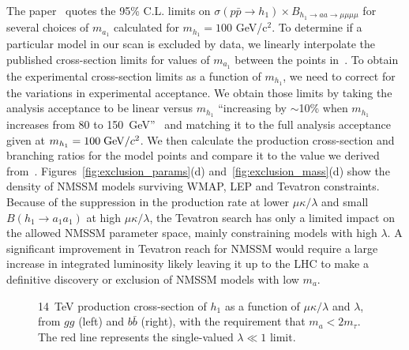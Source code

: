 \documentclass[aps,prl,nofootinbib,superscriptaddress]{revtex4}
\begin{document}
The paper~\cite{d0-low-ma} quotes the 95\% C.L. limits on $\sigma(p\bar{p} \to h_1) \times B_{h_1 \to aa \to \mu\mu\mu\mu}$ 
for several choices of $m_{a_1}$ calculated for $m_{h_1}=100$ GeV/c$^2$. To determine if a particular model in our scan
is excluded by data, we linearly interpolate the published cross-section limits for values of $m_{a_1}$ 
between the points in~\cite{d0-low-ma}. To obtain the experimental cross-section limits as a function of $m_{h_1}$, we 
need to correct for the variations in experimental acceptance. We obtain those limits by taking the analysis acceptance 
to be linear versus $m_{h_1}$ ``increasing by $\sim$10\% when $m_{h_1}$ increases from 
80 to 150~GeV''~\cite{d0-low-ma} and matching it to the full analysis acceptance given at $m_{h_1}=100\;\mbox{${\rm GeV}/c^2$}$. We 
then calculate the production cross-section and branching ratios for the model points and compare it to the 
value we derived from~\cite{d0-low-ma}. Figures~\ref{fig:exclusion_params}(d) and~\ref{fig:exclusion_mass}(d) 
show the density of NMSSM models surviving WMAP, LEP and Tevatron constraints. Because of the suppression in
the production rate at lower $\mu\kappa/\lambda$ and small $B(h_1 \to a_1 a_1)$ at high $\mu\kappa/\lambda$, the 
Tevatron search has only a limited impact on the allowed NMSSM parameter space, mainly constraining models with high 
$\lambda$. A significant improvement in Tevatron reach for NMSSM would require a large increase in integrated luminosity 
likely leaving it up to the LHC to make a definitive discovery or exclusion of NMSSM models with low $m_a$.

\begin{figure*}[t]
\caption{14~TeV production cross-section of $h_1$ as a function of
  $\mu\kappa/\lambda$ and $\lambda$, from $gg$ (left) and $b\bar{b}$
  (right), with the requirement that $m_a < 2m_\tau$.  The red line represents the single-valued $\lambda \ll 1$ limit.
  \label{fig:sm_mukoverl2}}
\end{figure*}
\end{document}
